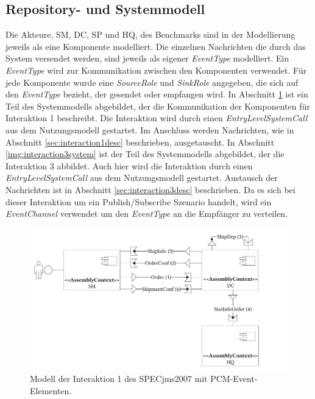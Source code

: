 \subsection{Repository- und Systemmodell}
Die Akteure, SM, DC, SP und HQ, des Benchmarks sind in der Modellierung jeweils als eine Komponente modelliert. Die einzelnen Nachrichten die durch das System versendet werden, sind jeweils als eigener \emph{EventType} modelliert. Ein \emph{EventType} wird zur Kommunikation zwischen den Komponenten verwendet. Für jede Komponente wurde eine \emph{SourceRole} und \emph{SinkRole} angegeben, die sich auf den \emph{EventType} bezieht, der gesendet oder empfangen wird. In Abschnitt \ref{img:interaction1system} ist ein Teil des Systemmodells abgebildet, der die Kommunikation der Komponenten für Interaktion 1 beschreibt. Die Interaktion wird durch einen \emph{EntryLevelSystemCall} aus dem Nutzungsmodell gestartet. Im Anschluss werden Nachrichten, wie in Abschnitt \ref{sec:interaction1desc} beschrieben, ausgetauscht. In Abschnitt \ref{img:interaction3system} ist der Teil des Systemmodells abgebildet, der die Interaktion 3 abbildet. Auch hier wird die Interaktion durch einen \emph{EntryLevelSystemCall} aus dem Nutzungsmodell gestartet. Austausch der Nachrichten ist in Abschnitt \ref{sec:interaction3desc} beschrieben. Da es sich bei dieser Interaktion um ein Publish/Subscribe Szenario handelt, wird ein \emph{EventChannel} verwendet um den \emph{EventType} an die Empfänger zu verteilen.

\begin{figure}
\center
  \includegraphics[width=1\textwidth]{images/evaluation/specjms/evaluationInteraktion1events.pdf}
  \caption{Modell der Interaktion 1 des SPECjms2007 mit PCM-Event-Elementen.}
  \label{img:interaction1system}
\end{figure}

